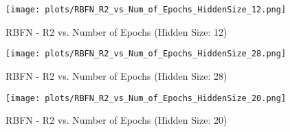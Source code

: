 \begin{figure}[H]
    \centering
    \texttt{[image: plots/RBFN\_R2\_vs\_Num\_of\_Epochs\_HiddenSize\_12.png]}
    \caption{RBFN - R2 vs. Number of Epochs (Hidden Size: 12)}
\end{figure}

\begin{figure}[H]
    \centering
    \texttt{[image: plots/RBFN\_R2\_vs\_Num\_of\_Epochs\_HiddenSize\_28.png]}
    \caption{RBFN - R2 vs. Number of Epochs (Hidden Size: 28)}
\end{figure}

\begin{figure}[H]
    \centering
    \texttt{[image: plots/RBFN\_R2\_vs\_Num\_of\_Epochs\_HiddenSize\_20.png]}
    \caption{RBFN - R2 vs. Number of Epochs (Hidden Size: 20)}
\end{figure}
